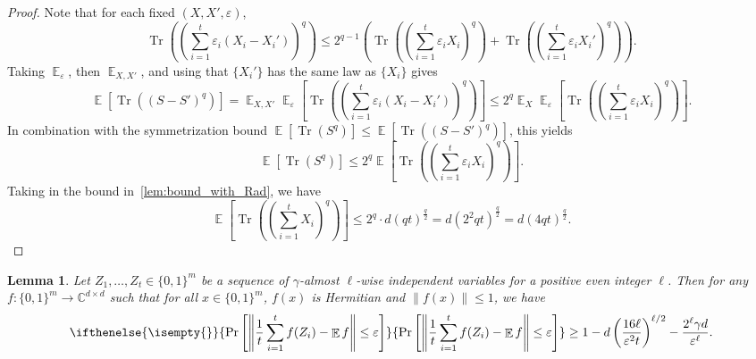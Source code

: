 \documentclass[11pt,letterpaper]{article}
\newtheorem{lemma}[theorem]{Lemma}
\newcommand{\C}{\mathbb{C}}
\DeclareMathOperator*{\E}{\mathbb{E}}
\DeclareMathOperator*{\Tr}{Tr}
\newcommand{\eps}{\varepsilon}
\newcommand{\1}{\mathbbm{1}}
\newcommand{\norm}[1]{\left\lVert #1\right\rVert}
\newcommand{\zo}{\{0, 1\}}
\newcommand{\Prb}[2][]{ \ifthenelse{\isempty{#1}}
  {\Pr\left[#2\right]}
  {\Pr_{#1}\left[#2\right]} }
\begin{document}
\begin{proof}
Note that for each fixed $(X,X',\varepsilon)$,
\[
   \Tr\left(\left(\sum_{i=1}^t \varepsilon_i (X_i - X_i')\right)^{q}\right)
    \le 
   2^{ q-1}\left(\Tr\left((\sum_{i=1}^t \varepsilon_i X_i)^{q}\right)
                 + \Tr\left((\sum_{i=1}^t \varepsilon_i X_i')^{q}\right)\right).
\]
Taking $\E_{\varepsilon}$, then $\E_{X,X'}$, and using that $\{X_i'\}$ has the same law as $\{X_i\}$ gives
\[
   \E\left[\Tr\left((S - S')^{q}\right)\right]
    = 
   \E_{X,X'} \E_{\varepsilon}\left[\Tr\left((\sum_{i=1}^t \varepsilon_i (X_i - X_i'))^{q}\right)\right]
    \le 
   2^{ q} \E_{X} \E_{\varepsilon}\left[\Tr\left((\sum_{i=1}^t \varepsilon_i X_i)^{q}\right)\right].
\]
In combination with the symmetrization bound 
\(\E[\Tr(S^{q})]\le \E[\Tr((S-S')^{q})]\),
this yields
\[
   \E\left[\Tr(S^{q})\right]
    \le 
   2^{ q} \E\left[\Tr\left((\sum_{i=1}^t \varepsilon_i X_i)^{q}\right)\right].
\]
Taking in the bound in~\cref{lem:bound_with_Rad}, we have 
\[
   \E\left[\Tr\left(\left(\sum_{i=1}^t X_i\right)^{q}\right)\right]
    \le 
   2^{ q} \cdot d (q t)^{ \frac{q}{2}}
    = 
   d \left(2^{2} q t\right)^{ \frac{q}{2}}
    = 
   d \left(4 q t\right)^{ \frac{q}{2}}.
\]
\end{proof}



\begin{lemma}
\label{lem:matrix_k_wise_concentration}
    Let $Z_1, \dots, Z_t \in \zo^m$ be a sequence of $\gamma$-almost $\ell$-wise independent  variables for a positive even  integer $\ell$. Then for any $f: \zo^m \to \C^{d \times d}$ such that for all $x \in \zo^m$, $f(x)$ is Hermitian and $\|f(x)\| \le 1$, we have \[
        \Prb{\norm{\frac{1}{t}\sum_{i=1}^t f(Z_i) - \E f} \le \eps} \ge 1 - 
        d \left( \frac{16\ell}{\eps^2 t} \right)^{\ell/2} - \frac{2^\ell \gamma d}{\eps^\ell}.
\]
\end{lemma}
\end{document}
